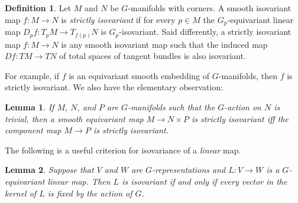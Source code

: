 \documentclass[11pt]{amsart}
\newtheorem{lem}{Lemma}[section]
\theoremstyle{definition}
\newtheorem{defn}{Definition}[section]
\numberwithin{equation}{section}
\numberwithin{figure}{section}
\newcommand{\ourdefn}[1]{{\it #1}}
\begin{document}
 \begin{defn}\label{strictly_isovariant}
		 Let $M$ and $N$ be $G$-manifolds with corners. A smooth isovariant map $f\colon M \to N$ is \ourdefn{strictly isovariant} if for every $p\in M$ the $G_p$-equivariant linear map $D_pf:T_pM\to T_{f(p)}N$ is $G_p$-isovariant. Said differently, a strictly isovariant map $f:M\to N$ is any smooth isovariant map such that the induced map $Df:TM \to TN$ of total spaces of tangent bundles is also isovariant.
 \end{defn}
 
For example, if $f$ is an equivariant smooth embedding of $G$-manifolds, then $f$ is strictly isovariant. We also have the elementary observation: 

\begin{lem}\label{iso_to_trivial_product}
	If $M$, $N$, and $P$ are $G$-manifolds such that the $G$-action on $N$ is trivial, then a smooth equivariant map $M \to N \times P$ is strictly isovariant iff the component map $M \to P$ is strictly isovariant.
\end{lem}

%

The following is a useful criterion for isovariance of a \emph{linear} map.

\begin{lem}\label{isolinear}
Suppose that $V$ and $W$ are $G$-representations and $L\colon V\to W$ is a $G$-equivariant linear map. Then $L$ is isovariant if and only if every vector in the kernel of $L$ is fixed by the action of $G$. 
\end{lem}
\end{document}
